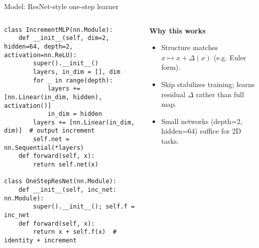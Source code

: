 \documentclass[aspectratio=169]{beamer}
\begin{document}
\begin{frame}[fragile]{Model: ResNet-style one-step learner}
\begin{columns}[T,totalwidth=\textwidth]
\begin{column}{0.56\textwidth}
\begin{lstlisting}[style=py,caption={Increment MLP + skip connection},label={lst:model}]
class IncrementMLP(nn.Module):
    def __init__(self, dim=2, hidden=64, depth=2, activation=nn.ReLU):
        super().__init__()
        layers, in_dim = [], dim
        for _ in range(depth):
            layers += [nn.Linear(in_dim, hidden), activation()]
            in_dim = hidden
        layers += [nn.Linear(in_dim, dim)]  # output increment
        self.net = nn.Sequential(*layers)
    def forward(self, x):
        return self.net(x)

class OneStepResNet(nn.Module):
    def __init__(self, inc_net: nn.Module):
        super().__init__(); self.f = inc_net
    def forward(self, x):
        return x + self.f(x)  # identity + increment
\end{lstlisting}
\end{column}
\begin{column}{0.44\textwidth}
\textbf{Why this works}
\begin{itemize}
  \item Structure matches $x \mapsto x + \Delta(x)$ (e.g. Euler form).
  \item Skip stabilizes training; learns residual \(\Delta\) rather than full map.
  \item Small networks (depth=2, hidden=64) suffice for 2D tasks.
\end{itemize}
\end{column}
\end{columns}
\end{frame}
\end{document}
